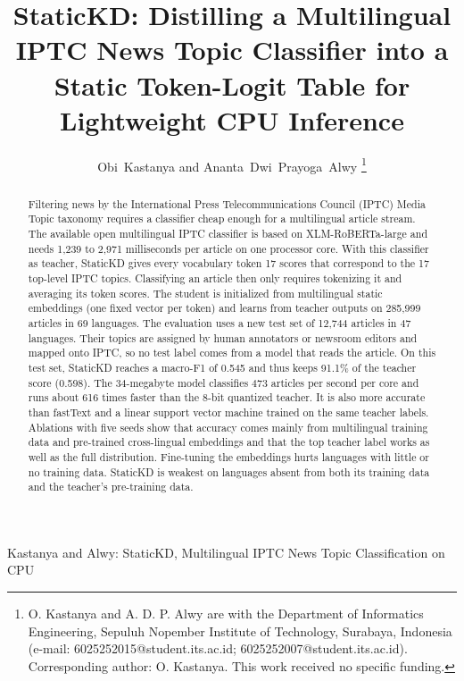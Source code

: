 \documentclass[journal]{IEEEtran}
\begin{document}
\title{StaticKD: Distilling a Multilingual IPTC News Topic Classifier into a Static Token-Logit Table for Lightweight CPU Inference}

\author{Obi~Kastanya and Ananta~Dwi~Prayoga~Alwy%
\thanks{O. Kastanya and A. D. P. Alwy are with the Department of Informatics Engineering, Sepuluh Nopember Institute of Technology, Surabaya, Indonesia (e-mail: 6025252015@student.its.ac.id; 6025252007@student.its.ac.id). Corresponding author: O. Kastanya. This work received no specific funding.}}

%
{Kastanya and Alwy: StaticKD, Multilingual IPTC News Topic Classification on CPU}

\maketitle

\begin{abstract}
Filtering news by the International Press Telecommunications Council (IPTC) Media Topic taxonomy requires a classifier cheap enough for a multilingual article stream. The available open multilingual IPTC classifier is based on XLM-RoBERTa-large and needs 1,239 to 2,971 milliseconds per article on one processor core. With this classifier as teacher, StaticKD gives every vocabulary token 17 scores that correspond to the 17 top-level IPTC topics. Classifying an article then only requires tokenizing it and averaging its token scores. The student is initialized from multilingual static embeddings (one fixed vector per token) and learns from teacher outputs on 285,999 articles in 69 languages. The evaluation uses a new test set of 12,744 articles in 47 languages. Their topics are assigned by human annotators or newsroom editors and mapped onto IPTC, so no test label comes from a model that reads the article. On this test set, StaticKD reaches a macro-F1 of 0.545 and thus keeps 91.1\% of the teacher score (0.598). The 34-megabyte model classifies 473 articles per second per core and runs about 616 times faster than the 8-bit quantized teacher. It is also more accurate than fastText and a linear support vector machine trained on the same teacher labels. Ablations with five seeds show that accuracy comes mainly from multilingual training data and pre-trained cross-lingual embeddings and that the top teacher label works as well as the full distribution. Fine-tuning the embeddings hurts languages with little or no training data. StaticKD is weakest on languages absent from both its training data and the teacher's pre-training data.
\end{abstract}
\end{document}
